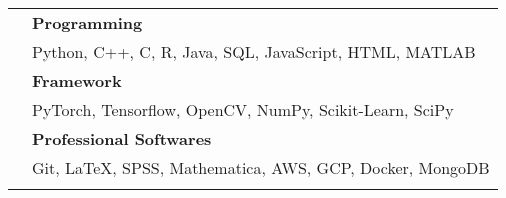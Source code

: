 \documentclass[letterpaper, 11pt]{article}
\begin{document}
\begin{longtable}{p{1.3in}p{4.8in}}

{\color{black}{Skills}} 
& \textbf{Programming}\\
& Python, C++, C, R, Java, SQL, JavaScript, HTML, MATLAB \\
& \textbf{Framework} \\
& PyTorch, Tensorflow, OpenCV, NumPy, Scikit-Learn, SciPy \\
& \textbf{Professional Softwares} \\
& Git, LaTeX, SPSS, Mathematica, AWS, GCP, Docker, MongoDB \\
& \\



\end{longtable}
\end{document}
